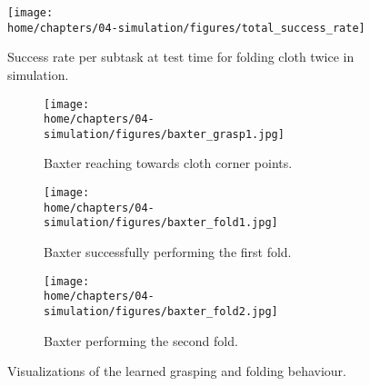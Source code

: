 \documentclass[\home/main.tex]{subfiles}
\begin{document}
%     

\begin{figure}[htbp]
    \centering
    \texttt{[image: \\home/chapters/04-simulation/figures/total\_success\_rate]}
    \caption[Success rate at test time for folding cloth twice in simulation.]{Success rate per subtask at test time for folding cloth twice in simulation.
    }
    \label{fig:sim_results_success_rate_test}
\end{figure}

\begin{figure}[htpb]{}
    \centering
    \begin{subfigure}[b]{\textwidth}
        \centering
        \texttt{[image: \\home/chapters/04-simulation/figures/baxter\_grasp1.jpg]}
        \caption{Baxter reaching towards cloth corner points.}
        \label{fig:baxter_results_grasp1}
    \end{subfigure}

    \begin{subfigure}[b]{\textwidth}
        \centering
        \texttt{[image: \\home/chapters/04-simulation/figures/baxter\_fold1.jpg]}
        \caption{Baxter successfully performing the first fold.}
        \label{fig:baxter_results_fold1}
    \end{subfigure}

    \begin{subfigure}[b]{\textwidth}
        \centering
        \texttt{[image: \\home/chapters/04-simulation/figures/baxter\_fold2.jpg]}
        \caption{Baxter performing the second fold.}
        \label{fig:baxter_results_fold2}
    \end{subfigure}

    \caption[]{Visualizations of the learned grasping and folding behaviour.}
    \label{fig:sim_drl_demo}
\end{figure}
\end{document}
